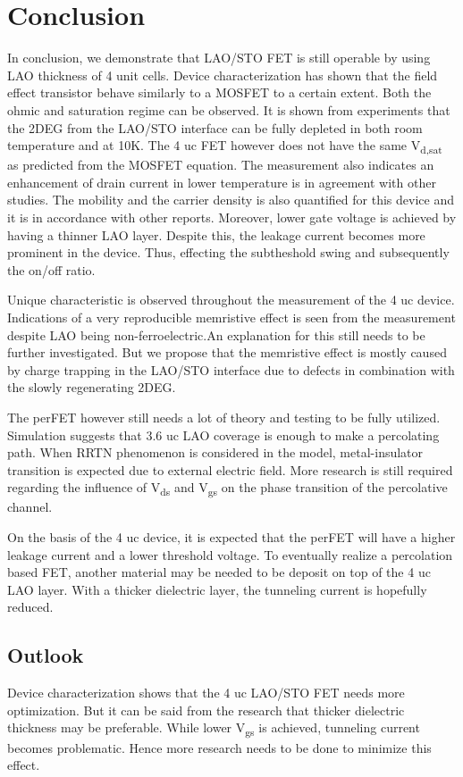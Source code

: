 \documentclass[11pt,a4paper]{report}
\begin{document}
\chapter{Conclusion}
In conclusion, we demonstrate that LAO/STO FET is still operable by using LAO thickness of 4 unit cells. Device characterization has shown that the field effect transistor behave similarly to a MOSFET to a certain extent. Both the ohmic and saturation regime can be observed. It is shown from experiments that the 2DEG from the LAO/STO interface can be fully depleted in both room temperature and at 10K. The 4 uc FET however does not have the same V\textsubscript{d,sat} as predicted from the MOSFET equation. The measurement also indicates an enhancement of drain current in lower temperature is in agreement with other studies. The mobility and the carrier density is also quantified for this device and it is in accordance with other reports. Moreover, lower gate voltage is achieved by having a thinner LAO layer. Despite this, the leakage current becomes more prominent in the device. Thus, effecting the subtheshold swing and subsequently the on/off ratio.

Unique characteristic is observed throughout the measurement of the 4 uc device. Indications of a very reproducible memristive effect is seen from the measurement despite LAO being non-ferroelectric.An explanation for this still needs to be further investigated. But we propose that the memristive effect is mostly caused by charge trapping in the LAO/STO interface due to defects in combination with the slowly regenerating 2DEG.

The perFET however still needs a lot of theory and testing to be fully utilized. Simulation suggests that 3.6 uc LAO coverage is enough to make a percolating path. When RRTN phenomenon is considered in the model, metal-insulator transition is expected due to external electric field. More research is still required regarding the influence of V\textsubscript{ds} and V\textsubscript{gs} on the phase transition of the percolative channel. 

On the basis of the 4 uc device, it is expected that the perFET will have a higher leakage current and a lower threshold voltage. To eventually realize a percolation based FET, another material may be needed to be deposit on top of the 4 uc LAO layer. With a thicker dielectric layer, the tunneling current is hopefully reduced.

\newpage
\section*{Outlook}
Device characterization shows that the 4 uc LAO/STO FET needs more optimization. But it can be said from the research that thicker dielectric thickness may be preferable. While lower V\textsubscript{gs} is achieved, tunneling current becomes problematic. Hence more research needs to be done to minimize this effect.
\end{document}
